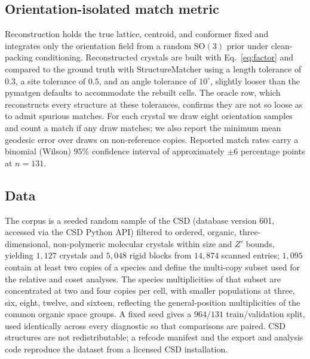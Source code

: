 \documentclass[11pt]{article}
\begin{document}
\subsection{Orientation-isolated match metric}
Reconstruction holds the true lattice, centroid, and conformer fixed and
integrates only the orientation field from a random $\mathrm{SO}(3)$ prior under
clean-packing conditioning. Reconstructed crystals are built with
Eq.~\eqref{eq:factor} and compared to the ground truth with
StructureMatcher\cite{ong2013pymatgen} using a length tolerance of $0.3$, a site
tolerance of $0.5$, and an angle tolerance of $10^\circ$, slightly looser than
the pymatgen defaults to accommodate the rebuilt cells. The oracle row, which
reconstructs every structure at these tolerances, confirms they are not so loose
as to admit spurious matches. For each crystal we draw eight orientation samples
and count a match if any draw matches; we also report the minimum mean geodesic
error over draws on non-reference copies. Reported match rates carry a binomial
(Wilson) $95\%$ confidence interval of approximately $\pm6$ percentage points at
$n=131$.

\subsection{Data}
The corpus is a seeded random sample of the CSD (database version 601, accessed
via the CSD Python API)\cite{groom2016csd} filtered to ordered, organic,
three-dimensional, non-polymeric molecular crystals within size and
$Z'$ bounds, yielding $1{,}127$ crystals and $5{,}048$ rigid blocks from
$14{,}874$ scanned entries; $1{,}095$ contain at least two copies of a species
and define the multi-copy subset used for the relative and coset analyses. The
species multiplicities of that subset are concentrated at two and four copies
per cell, with smaller populations at three, six, eight, twelve, and sixteen,
reflecting the general-position multiplicities of the common organic space
groups. A fixed seed gives a $964/131$ train/validation split, used identically
across every diagnostic so that comparisons are paired. CSD structures are not
redistributable; a refcode manifest and the export and analysis code reproduce
the dataset from a licensed CSD installation.
\end{document}
